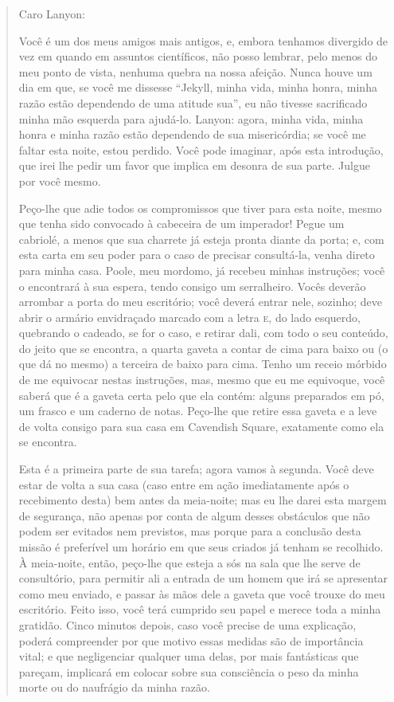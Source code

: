 \begin{quote}
Caro Lanyon:

Você é um dos meus amigos mais antigos, e, embora tenhamos divergido de
vez em quando em assuntos científicos, não posso lembrar, pelo menos do
meu ponto de vista, nenhuma quebra na nossa afeição. Nunca houve um dia
em que, se você me dissesse “Jekyll, minha vida, minha honra, minha
razão estão dependendo de uma atitude sua”, eu não tivesse sacrificado
minha mão esquerda para ajudá-lo.  Lanyon: agora, minha vida, minha
honra e minha razão estão dependendo de sua misericórdia; se você me
faltar esta noite, estou perdido.  Você pode imaginar, após esta
introdução, que irei lhe pedir um favor que implica em desonra de sua
parte.  Julgue por você mesmo.

Peço-lhe que adie todos os compromissos que tiver para esta noite, mesmo
que tenha sido convocado à cabeceira de um imperador!  Pegue um
cabriolé, a menos que sua charrete já esteja pronta diante da porta; e,
com esta carta em seu poder para o caso de precisar consultá-la, venha
direto para minha casa.  Poole, meu mordomo, já recebeu minhas
instruções; você o encontrará à sua espera, tendo consigo um
serralheiro.  Vocês deverão arrombar a porta do meu escritório; você
deverá entrar nele, sozinho; deve abrir o armário envidraçado marcado
com a letra \textsc{e}, do lado esquerdo, quebrando o cadeado, se for o caso, e
retirar dali, com todo o seu conteúdo, do jeito que se encontra, a
quarta gaveta a contar de cima para baixo ou (o que dá no mesmo) a
terceira de baixo para cima.  Tenho um receio mórbido de me equivocar
nestas instruções, mas, mesmo que eu me equivoque, você saberá que é a
gaveta certa pelo que ela contém: alguns preparados em pó, um frasco e
um caderno de notas.  Peço-lhe que retire essa gaveta e a leve de volta
consigo para sua casa em Cavendish Square, exatamente como ela se
encontra.

Esta é a primeira parte de sua tarefa; agora vamos à segunda.  Você deve
estar de volta a sua casa (caso entre em ação imediatamente após o
recebimento desta) bem antes da meia-noite; mas eu lhe darei esta
margem de segurança, não apenas por conta de algum desses obstáculos
que não podem ser evitados nem previstos, mas porque para a conclusão
desta missão é preferível um horário em que seus criados já tenham se
recolhido.  À meia-noite, então, peço-lhe que esteja a sós na sala que
lhe serve de consultório, para permitir ali a entrada de um homem que
irá se apresentar como meu enviado, e passar às mãos dele a gaveta que
você trouxe do meu escritório.  Feito isso, você terá cumprido seu
papel e merece toda a minha gratidão.  Cinco minutos depois, caso você
precise de uma explicação, poderá compreender por que motivo essas
medidas são de importância vital; e que negligenciar qualquer uma
delas, por mais fantásticas que pareçam, implicará em colocar sobre sua
consciência o peso da minha morte ou do naufrágio da minha razão.


\end{quote}

